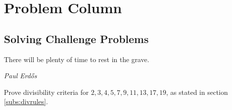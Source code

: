 \documentclass[problems.tex]{subfile}
\begin{document}
\part{Problem Column}
	\chapter{Solving Challenge Problems}\label{ch:solved}

	\epigraph{There will be plenty of time to rest in the grave.}{\textit{Paul Erd\H{o}s}}

	\begin{problem}
		Prove divisibility criteria for $2,3,4,5,7,9,11,13,17,19$, as stated in section \eqref{subs:divrules}\watermark.
	\end{problem}
\end{document}
